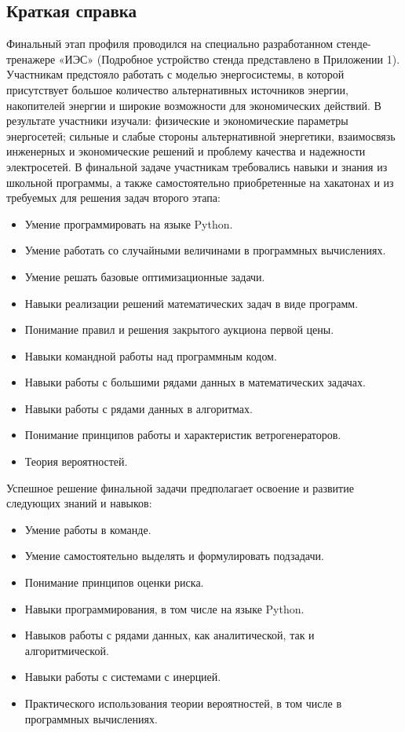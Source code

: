 \subsection*{Краткая справка}

Финальный этап профиля проводился на специально разработанном стенде-тренажере «ИЭС» (Подробное устройство стенда представлено в Приложении 1). Участникам предстояло работать с моделью энергосистемы, в которой присутствует большое количество альтернативных источников энергии, накопителей энергии и широкие возможности для экономических действий. В результате участники изучали: физические и экономические параметры энергосетей; сильные и слабые стороны альтернативной энергетики, взаимосвязь инженерных и экономические решений и проблему качества и надежности электросетей.
В финальной задаче участникам требовались навыки и знания из школьной программы, а также самостоятельно приобретенные на хакатонах и из требуемых для решения задач второго этапа:
\begin{itemize}
    \item Умение программировать на языке Python.
    \item Умение работать со случайными величинами в программных вычислениях.
    \item Умение решать базовые оптимизационные задачи.
    \item Навыки реализации решений математических задач в виде программ.
    \item Понимание правил и решения закрытого аукциона первой цены.
    \item Навыки командной работы над программным кодом.
    \item Навыки работы с большими рядами данных в математических задачах.
    \item Навыки работы с рядами данных в алгоритмах.
    \item Понимание принципов работы и характеристик ветрогенераторов.
    \item Теория вероятностей.
\end{itemize}

Успешное решение финальной задачи предполагает освоение и развитие следующих знаний и навыков:
\begin{itemize}
    \item Умение работы в команде.
    \item Умение самостоятельно выделять и формулировать подзадачи.
    \item Понимание принципов оценки риска.
    \item Навыки программирования, в том числе на языке Python.
    \item Навыков работы с рядами данных, как аналитической, так и алгоритмической.
    \item Навыки работы с системами с инерцией.
    \item Практического использования теории вероятностей, в том числе в программных вычислениях.
\end{itemize}
